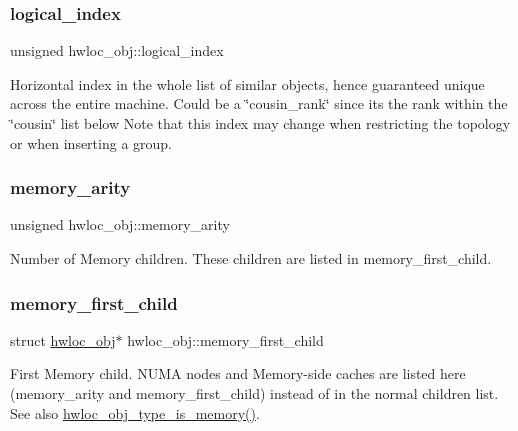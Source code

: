 \subsubsection{\texorpdfstring{logical\+\_\+index}{logical\_index}}
{\footnotesize\ttfamily unsigned hwloc\+\_\+obj\+::logical\+\_\+index}



Horizontal index in the whole list of similar objects, hence guaranteed unique across the entire machine. Could be a \char`\"{}cousin\+\_\+rank\char`\"{} since it\textquotesingle{}s the rank within the \char`\"{}cousin\char`\"{} list below Note that this index may change when restricting the topology or when inserting a group. 

\mbox{\label{a00238_a6f834ea4dd26553cdea601d2fae6d3b7}} 
\subsubsection{\texorpdfstring{memory\+\_\+arity}{memory\_arity}}
{\footnotesize\ttfamily unsigned hwloc\+\_\+obj\+::memory\+\_\+arity}



Number of Memory children. These children are listed in {\ttfamily memory\+\_\+first\+\_\+child}. 

\mbox{\label{a00238_ac0e8200dba25b90d5954bd4ec61f97d3}} 
\subsubsection{\texorpdfstring{memory\+\_\+first\+\_\+child}{memory\_first\_child}}
{\footnotesize\ttfamily struct \hyperlink{a00238}{hwloc\+\_\+obj}$\ast$ hwloc\+\_\+obj\+::memory\+\_\+first\+\_\+child}



First Memory child. N\+U\+MA nodes and Memory-\/side caches are listed here ({\ttfamily memory\+\_\+arity} and {\ttfamily memory\+\_\+first\+\_\+child}) instead of in the normal children list. See also \hyperlink{a00198_ga1d074390c8a3dc3088d84f73fb73f966}{hwloc\+\_\+obj\+\_\+type\+\_\+is\+\_\+memory()}. 

